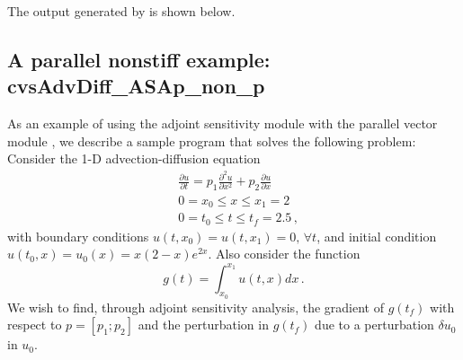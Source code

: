 The output generated by  is shown below.



\subsection{A parallel nonstiff example: cvsAdvDiff\_ASAp\_non\_p}
\label{ss:cvsAdvDiff_ASAp_non_p}

As an example of using the {\cvodes} adjoint sensitivity module with the
parallel vector module {\nvecp}, we describe a sample program that solves
the following problem:  Consider the 1-D advection-diffusion equation
\begin{equation}\label{e:cvsAdvDiff_ASAp_non_p:orig_pde}
  \begin{split}
    & \frac{\partial u}{\partial t} = p_1 \frac{\partial^2 u}{\partial x^2} 
    + p_2 \frac{\partial u}{\partial x} \\
    & 0 = x_0 \le x \le x_1 = 2 \\
    & 0 = t_0 \le t \le t_f = 2.5 \, ,
  \end{split}
\end{equation}
with boundary conditions $u(t,x_0) = u(t,x_1) = 0 ,\, \forall t$,
and initial condition $u(t_0 , x) = u_0(x) = x(2-x)e^{2x}$. Also
consider the function
\begin{equation*}
  g(t) = \int_{x_0}^{x_1} u(t,x) dx \, .
\end{equation*}
We wish to find, through adjoint sensitivity analysis, the gradient of
$g(t_f)$ with respect to $p = [p_1 ; p_2]$ and the perturbation in $g(t_f)$
due to a perturbation $\delta u_0$ in $u_0$.

